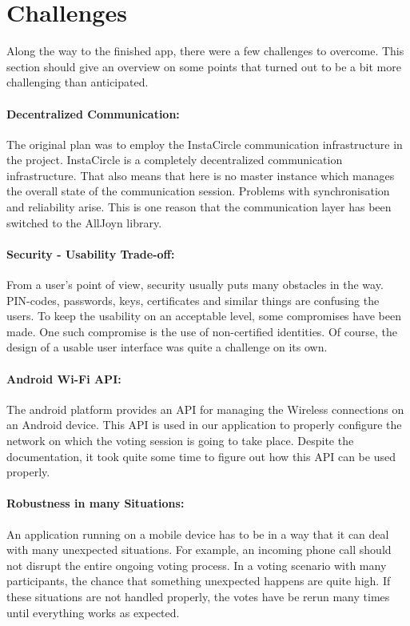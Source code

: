 \documentclass[numbers=noenddot, abstract=on, a4paper, headsepline,
footsepline, oneside, openright, draft=off, listof=leveldown]{scrreprt}
\begin{document}
\section{Challenges}
Along the way to the finished app, there were a few challenges to overcome. This
section should give an overview on some points that turned out to be a bit more
challenging than anticipated.

\paragraph{Decentralized Communication:} The original plan was to employ the
InstaCircle communication infrastructure in the project. InstaCircle is a
completely decentralized communication infrastructure. That also means that here
is no master instance which manages the overall state of the communication
session. Problems with synchronisation and reliability arise. This is one reason
that the communication layer has been switched to the AllJoyn library.

\paragraph{Security - Usability Trade-off:} From a user's point of view,
security usually puts many obstacles in the way. PIN-codes, passwords, keys,
certificates and similar things are confusing the users. To keep the usability
on an acceptable level, some compromises have been made. One such compromise is
the use of non-certified identities. Of course, the design of a usable user
interface was quite a challenge on its own.

\paragraph{Android Wi-Fi API:} The android platform provides an API for managing
the Wireless connections on an Android device. This API is used in our
application to properly configure the network on which the voting session is
going to take place. Despite the documentation, it took quite some time to
figure out how this API can be used properly.

\paragraph{Robustness in many Situations:} An application running on a mobile
device has to be in a way that it can deal with many unexpected situations. For
example, an incoming phone call should not disrupt the entire ongoing voting
process. In a voting scenario with many participants, the chance that something
unexpected happens are quite high. If these situations are not handled properly,
the votes have be rerun many times until everything works as expected.
\end{document}

